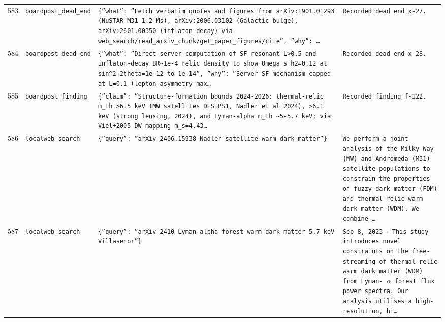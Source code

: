 \documentclass[11pt,a4paper]{article}
\begin{document}
\begin{longtable}{@{}p{}p{}p{}p{}@{}}
583 & \texttt{board}\newline\texttt{post\_\allowbreak{}dead\_\allowbreak{}end} & \texttt{\{''what'':\allowbreak{} ''Fetch verbatim quotes and figures from arXiv:\allowbreak{}1901.01293 (NuSTAR M31 1.2 Ms)\allowbreak{},\allowbreak{} arXiv:\allowbreak{}2006.03102 (Galactic bulge)\allowbreak{},\allowbreak{} arXiv:\allowbreak{}2601.00350 (inflaton-decay)\allowbreak{} via web\_\allowbreak{}search/\allowbreak{}read\_\allowbreak{}arxiv\_\allowbreak{}chunk/\allowbreak{}get\_\allowbreak{}paper\_\allowbreak{}figures/\allowbreak{}cite'',\allowbreak{} ''why'':\allowbreak{} \ldots{}\allowbreak{}} & \texttt{Recorded dead end x-27.} \\
584 & \texttt{board}\newline\texttt{post\_\allowbreak{}dead\_\allowbreak{}end} & \texttt{\{''what'':\allowbreak{} ''Direct server computation of SF resonant L\textgreater{}\allowbreak{}0.5 and inflaton-decay BR\textasciitilde{}\allowbreak{}1e-4 relic density to show Omega\_\allowbreak{}s h2=\allowbreak{}0.12 at sin\textasciicircum{}\allowbreak{}2 2theta=\allowbreak{}1e-12 to 1e-14'',\allowbreak{} ''why'':\allowbreak{} ''Server SF mechanism capped at L=\allowbreak{}0.1 (lepton\_\allowbreak{}asymmetry max\ldots{}\allowbreak{}} & \texttt{Recorded dead end x-28.} \\
585 & \texttt{board}\newline\texttt{post\_\allowbreak{}finding} & \texttt{\{''claim'':\allowbreak{} ''Structure-formation bounds 2024-2026:\allowbreak{} thermal-relic m\_\allowbreak{}th \textgreater{}\allowbreak{}6.5 keV (MW satellites DES+PS1,\allowbreak{} Nadler et al 2024)\allowbreak{},\allowbreak{} \textgreater{}\allowbreak{}6.1 keV (strong lensing,\allowbreak{} 2024)\allowbreak{},\allowbreak{} and Lyman-alpha m\_\allowbreak{}th \textasciitilde{}\allowbreak{}5-5.7 keV;\allowbreak{} via Viel+2005 DW mapping m\_\allowbreak{}s=\allowbreak{}4.43\ldots{}\allowbreak{}} & \texttt{Recorded finding f-122.} \\
586 & \texttt{local}\newline\texttt{web\_\allowbreak{}search} & \texttt{\{''query'':\allowbreak{} ''arXiv 2406.15938 Nadler satellite warm dark matter''\}\allowbreak{}} & \texttt{We perform a joint analysis of the Milky Way (MW)\allowbreak{} and Andromeda (M31)\allowbreak{} satellite populations to constrain the properties of fuzzy dark matter (FDM)\allowbreak{} and thermal-relic warm dark matter (WDM)\allowbreak{}. We combine \ldots{}\allowbreak{}} \\
587 & \texttt{local}\newline\texttt{web\_\allowbreak{}search} & \texttt{\{''query'':\allowbreak{} ''arXiv 2410 Lyman-alpha forest warm dark matter 5.7 keV Villasenor''\}\allowbreak{}} & \texttt{Sep 8,\allowbreak{} 2023 $\cdot$ This study introduces novel constraints on the free-streaming of thermal relic warm dark matter (WDM)\allowbreak{} from Lyman- $\alpha$ forest flux power spectra. Our analysis utilises a high-resolution,\allowbreak{} hi\ldots{}\allowbreak{}} \\

\end{longtable}
\end{document}
